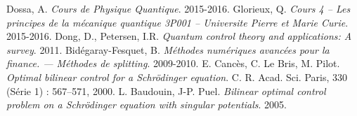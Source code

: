 \begin{thebibliography}{KNU90}
\vspace{0.5cm}
 Dossa, A.
\emph{Cours de Physique Quantique}. 2015-2016.
\vspace{0.5cm}
 Glorieux, Q.
\emph{Cours 4 – Les principes de la mécanique quantique
3P001 – Universite Pierre et Marie Curie}. 2015-2016.
\vspace{0.5cm}
 Dong, D., Petersen, I.R.
\emph{Quantum control theory and applications: A survey}. 2011.
\vspace{0.5cm}
 Bidégaray-Fesquet, B.
\emph{Méthodes numériques avancées pour la finance. — Méthodes de splitting}. 2009-2010.
\vspace{0.5cm}
 E. Cancès, C. Le Bris, M. Pilot.
\emph{Optimal bilinear control for a Schrödinger equation}. C. R. Acad. Sci. Paris, 330 (Série 1) : 567–571, 2000.
\vspace{0.5cm}
 L. Baudouin, J-P. Puel.
\emph{Bilinear optimal control problem on a Schrödinger equation with singular potentials}. 2005.
\end{thebibliography}
